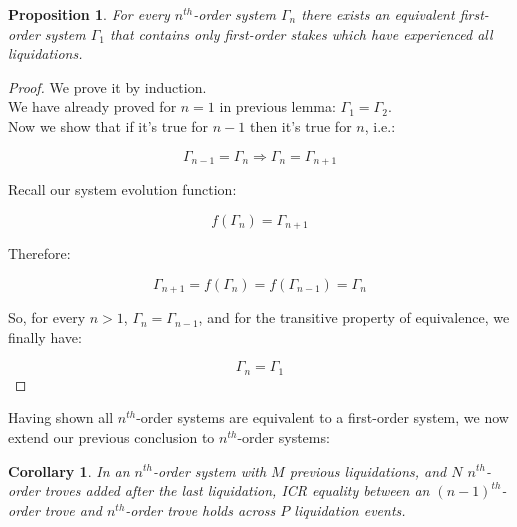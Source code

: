 \documentclass[reqno]{article}
\newtheorem{corollary}{Corollary}[theorem]
\newtheorem{proposition}[theorem]{Proposition}
\begin{document}
\begin{proposition} \label{result:6}
  For every $n^{th}$-order system $\Gamma_n$ there exists an equivalent first-order system $\Gamma_1$ that contains only first-order stakes which have experienced all liquidations.
\end{proposition}

\begin{proof}
  We prove it by induction.\\
  We have already proved for $n=1$ in previous lemma: $\Gamma_1=\Gamma_2$.\\
  Now we show that if it’s true for $n-1$ then it’s true for $n$, i.e.:

\begin{equation}
    \Gamma_{n-1} = \Gamma_n \Rightarrow \Gamma_n = \Gamma_{n+1}
\end{equation}

Recall our system evolution function: 

\begin{equation} 
    f(\Gamma_n)=\Gamma_{n+1}
\end{equation}

Therefore:

\begin{equation} 
    \Gamma_{n+1} = f(\Gamma_n) = f(\Gamma_{n-1}) = \Gamma_n
\end{equation}

\bigskip
So, for every $n > 1$, $\Gamma_n = \Gamma_{n-1}$, and for the transitive property of equivalence, we finally have:

\begin{equation}
    \Gamma_n=\Gamma_1
\end{equation}
\end{proof}

\bigskip
Having shown all $n^{th}$-order systems are equivalent to a first-order system, we now extend our previous conclusion to $n^{th}$-order systems:

\begin{corollary} \label{result:7}
  In an $n^{th}$-order system with $M$ previous liquidations, and $N$ $n^{th}$-order troves added after the last liquidation, ICR equality between an $(n-1)^{th}$-order trove and $n^{th}$-order trove holds across $P$ liquidation events.
\end{corollary}
\end{document}
